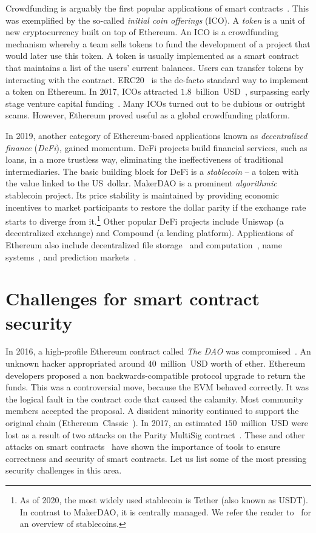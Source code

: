Crowdfunding is arguably the first popular applications of smart contracts~\cite{McAdams2017}.
This was exemplified by the so-called \textit{initial coin offerings} (ICO).
A \textit{token} is a unit of new cryptocurrency built on top of Ethereum.
An ICO is a crowdfunding mechanism whereby a team sells tokens to fund the development of a project that would later use this token.
A token is usually implemented as a smart contract that maintains a list of the users' current balances.
Users can transfer tokens by interacting with the contract.
ERC20~\cite{Victor2019} is the de-facto standard way to implement a token on Ethereum.
In 2017, ICOs attracted $1.8$~billion~USD~\cite{CoindeakICOTracker}, surpassing early stage venture capital funding~\cite{Sunnarborg2017}.
Many ICOs turned out to be dubious or outright scams.
However, Ethereum proved useful as a global crowdfunding platform.

In 2019, another category of Ethereum-based applications known as \textit{decentralized finance} (\textit{DeFi}), gained momentum.
DeFi projects build financial services, such as loans, in a more trustless way, eliminating the ineffectiveness of traditional intermediaries.
The basic building block for DeFi is a \textit{stablecoin} -- a token with the value linked to the US~dollar.
MakerDAO is a prominent \textit{algorithmic} stablecoin project.
Its price stability is maintained by providing economic incentives to market participants to restore the dollar parity if the exchange rate starts to diverge from it.\footnote{As of 2020, the most widely used stablecoin is Tether (also known as USDT). In contrast to MakerDAO, it is centrally managed. We refer the reader to~\cite{Clark2020,KlagesMundt2020} for an overview of stablecoins.}
Other popular DeFi projects include Uniswap (a decentralized exchange) and Compound (a lending platform).
Applications of Ethereum also include decentralized file storage~\cite{Storj} and computation~\cite{Golem}, name systems~\cite{ENS}, and prediction markets~\cite{Augur, Gnosis}.


\section{Challenges for smart contract security}

In 2016, a high-profile Ethereum contract called \textit{The DAO} was compromised~\cite{Sirer2016}.
An unknown hacker appropriated around $40$~million~USD worth of ether.
Ethereum developers proposed a non backwards-compatible protocol upgrade to return the funds.
This was a controversial move, because the EVM behaved correctly.
It was the logical fault in the contract code that caused the calamity.
Most community members accepted the proposal.
A dissident minority continued to support the original chain (Ethereum~Classic~\cite{EthereumClassic}).
In 2017, an estimated $150$~million~USD were lost as a result of two attacks on the Parity MultiSig contract~\cite{Palladino2017}.
These and other attacks on smart contracts~\cite{Delmolino2016, Atzei2017} have shown the importance of tools to ensure correctness and security of smart contracts.
Let us list some of the most pressing security challenges in this area.

